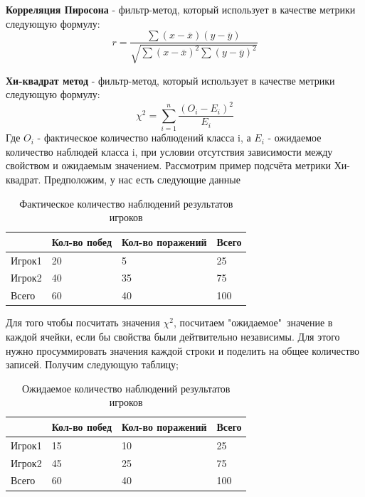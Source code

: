 \textbf{Корреляция Пиросона} - фильтр-метод, который использует в качестве метрики следующую формулу:
\begin{equation}
r=\frac{\sum(x - \overline{x})(y - \overline{y})}{\sqrt{\sum(x - \overline{x})^2\sum(y - \overline{y})^2}}
\end{equation}

\textbf{Хи-квадрат метод} - фильтр-метод, который использует в качестве метрики следующую формулу:
\begin{equation}
\label{chi2}
\chi^2=\sum_{i=1}^n\frac{(O_i - E_i)^2}{E_i}
\end{equation}
Где $O_i$ - фактическое количество наблюдений класса i, а $E_i$ - ожидаемое количество наблюдей класса i, при условии отсутствия зависимости между свойством и ожидаемым значением.
Рассмотрим пример подсчёта метрики Хи-квадрат.
Предположим, у нас есть следующие данные
\begin{table}[!h]
	
	\caption{\label{tab:table1}Фактическое количество наблюдений результатов игроков}
	
	\begin{center}
\begin{tabular}{|l|l|l|l|}

\hline

  & Кол-во побед & Кол-во поражений & Всего \\
\hline
Игрок1  & 20 & 5 & 25 \\
\hline
Игрок2  & 40 & 35 & 75 \\
\hline
Всего  & 60 & 40 & 100 \\
\hline

\end{tabular}
		
\end{center}

\end{table}

Для того чтобы посчитать значения $\chi^2$, посчитаем "ожидаемое"\ значение в каждой ячейки, если бы свойства были дейтвительно независимы. Для этого нужно просуммировать значения каждой строки и поделить на общее количество записей.
Получим следующую таблицу;
\begin{table}[!h]
	
	\caption{\label{tab:table2}Ожидаемое количество наблюдений результатов игроков}
	
	\begin{center}
\begin{tabular}{|l|l|l|l|}

\hline

  & Кол-во побед & Кол-во поражений & Всего \\
\hline
Игрок1  & 15 & 10 & 25 \\
\hline
Игрок2  & 45 & 25 & 75 \\
\hline
Всего  & 60 & 40 & 100 \\
\hline

\end{tabular}
		
\end{center}

\end{table}

